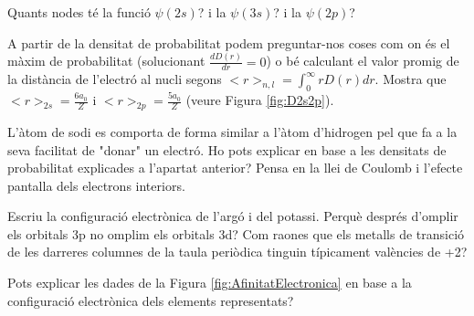 \begin{exr}
Quants nodes té la funció $\psi(2s)$? i la $\psi(3s)$? i la $\psi(2p)$? 
\end{exr}
\begin{exr}
    A partir de la densitat de probabilitat podem preguntar-nos coses com on és el màxim de probabilitat (solucionant  $\frac{d D(r)}{dr}=0$) o bé calculant el valor promig de la distància de l'electró al nucli segons $<r>_{n,l}=\int_0^{\infty} r D(r)dr$. Mostra que $<r>_{2s}=\frac{6a_0}{Z}$ i $<r>_{2p}=\frac{5a_0}{Z}$ (veure Figura \ref{fig:D2s2p}).%
    \end{exr}
    \begin{exr}
        L'àtom de sodi es comporta de forma similar a l'àtom d'hidrogen pel que fa a la seva facilitat de "donar" un electró. Ho pots explicar en base a les densitats de probabilitat explicades a l'apartat anterior? Pensa en la llei de Coulomb i l'efecte pantalla dels electrons interiors.
        \end{exr}
        \begin{exr}
            Escriu la configuració electrònica de l'argó i del potassi. Perquè després d'omplir els orbitals 3p no omplim els orbitals 3d? Com raones que els metalls de transició de les  darreres columnes de la taula periòdica tinguin típicament valències de +2?
            \end{exr}
            \begin{exr}
                Pots explicar les dades de la Figura \ref{fig:AfinitatElectronica} en base a la configuració electrònica dels elements representats?
                \end{exr}